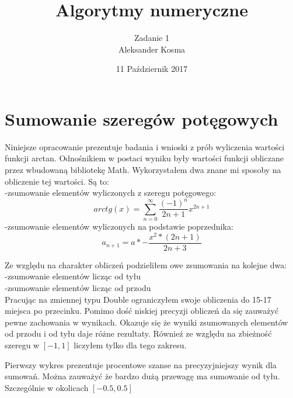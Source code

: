 \documentclass[12pt]{article}
\title{Algorytmy numeryczne}
\author{Zadanie 1 \\ Aleksander Kosma}
\date{11 Październik 2017}
\begin{document}
\maketitle 

\section{Sumowanie szeregów potęgowych}



Niniejsze opracowanie prezentuje badania i wnioski z prób wyliczenia wartości funkcji arctan.
Odnośnikiem w postaci wyniku były wartości funkcji obliczane przez wbudowaną bibliotekę Math.
Wykorzystałem dwa znane mi sposoby na obliczenie tej wartości. Są to:\\
-zsumowanie elementów wyliczonych z szeregu potęgowego:\\
$$arctg(x) = \sum_{n=0}^{\infty}\frac{(-1)^n}{2n + 1} x^{2n + 1}$$
-zsumowanie elementów wyliczonych na podstawie poprzednika:\\
$$a_{n+1}= a *-\frac{x^2 * (2n + 1)}{2n + 3}$$

Ze względu na charakter obliczeń podzieliłem owe zsumowania na kolejne dwa:\\
-zsumowanie elementów licząc od tyłu\\
-zsumowanie elementów licząc od przodu\\

Pracując na zmiennej typu Double ograniczyłem swoje obliczenia do 15-17 miejsca po przecinku.
Pomimo dość niskiej precyzji obliczeń da się zauważyć pewne zachowania w wynikach. Okazuje się że wyniki
zsumowanych elementów od przodu i od tyłu daje różne rezultaty. Również ze względu na zbieżność szeregu w $[-1,1]$ 
liczyłem tylko dla tego zakresu.

Pierwszy wykres prezentuje procentowe szanse na precyzyjniejszy wynik dla sumowań.
Można zauważyć że bardzo dużą przewagę ma sumowanie od tyłu. Szczególnie w okolicach $[-0.5,0.5]$

\begin{center}
\end{center}
\end{document}

